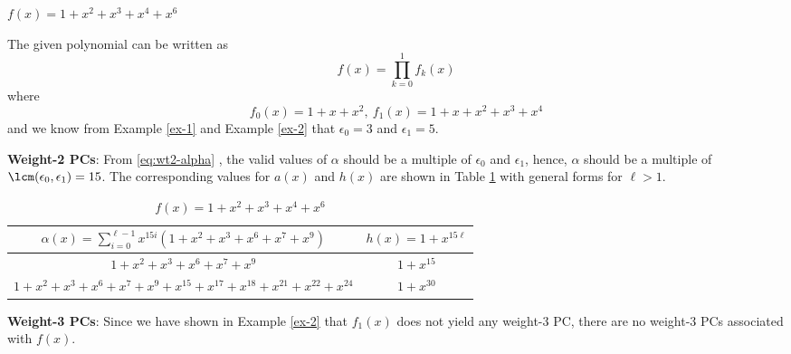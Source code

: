 \begin{example}
$f(x)=1+x^2+x^3+x^4+x^6$

The given polynomial can be written as 
$$f(x)=\prod_{k=0}^{1}f_k(x)$$
where 
$$f_0(x)=1+x+x^2,~f_1(x)=1+x+x^2+x^3+x^4$$ 
and we know from Example \ref{ex-1} and Example \ref{ex-2} that $\epsilon_0=3$ and $\epsilon_1=5$.

\textbf{Weight-2 PCs}: 
From \eqref{eq:wt2-alpha} , the valid values of $\alpha$ should be a multiple of $\epsilon_0$ and $\epsilon_1$, hence, $\alpha$ should be a multiple of $\lcm(\epsilon_0,\epsilon_1)=15$.
The corresponding values for $a(x)$ and $h(x)$ are shown in Table \ref{novelTab1-c} with general forms for $\ell>1$.

\begin{table}[htbp]
\renewcommand{\arraystretch}{1.3}
 \caption{$f(x)=1+x^2+x^3+x^4+x^6$}
 \centering
\begin{tabular}{c c } 
\hline
 $\alpha(x)=\sum_{i=0}^{\ell-1} x^{15i}(1+x^2+x^3+x^6+x^7+x^9)$ & $h(x)=1+x^{15\ell}$ \\ [0.5ex] 
\hline\hline
$1+x^2+x^3+x^6+x^7+x^9$ & $1+x^{15}$\\ 
$1+x^2+x^3+x^6+x^7+x^9+x^{15}+x^{17}+x^{18}+x^{21}+x^{22}+x^{24}$ & $1+x^{30}$ \\
\end{tabular}
 \label{novelTab1-c}
\end{table}

\textbf{Weight-3 PCs}:
Since we have shown in Example \ref{ex-2} that $f_1(x)$ does not yield any weight-3 PC, there are no weight-3 PCs associated with $f(x)$.
\end{example}

